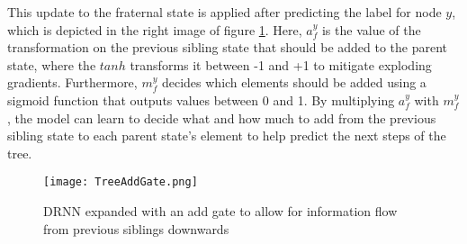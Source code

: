 This update to the fraternal state is applied after predicting the label for node $y$, which is depicted in the right image of figure \ref{fig:treeAddGate}. Here, $a_f^y$ is the value of the transformation on the previous sibling state that should be added to the parent state, where the $tanh$ transforms it between -1 and +1 to mitigate exploding gradients. Furthermore, $m_f^y$ decides which elements should be added using a sigmoid function that outputs values between 0 and 1. By multiplying $a_f^y$ with $m_f^y$, the model can learn to decide what and how much to add from the previous sibling state to each parent state's element to help predict the next steps of the tree.


\begin{figure}[ht!]
    \centering
    \texttt{[image: TreeAddGate.png]}
    \caption{DRNN expanded with an add gate to allow for information flow from previous siblings downwards}
    \label{fig:treeAddGate}
\end{figure}


% 

\newpage
